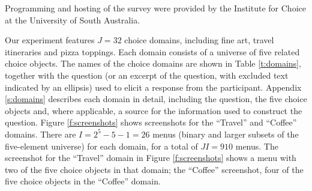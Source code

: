 \documentclass[11pt,letter]{article}
\newcommand{\menus}{menus}
\begin{document}
Programming and hosting of the survey were provided by the Institute for Choice at the University of South Australia.

Our experiment features $J=32$ choice domains, including fine art, travel itineraries and pizza toppings.
Each domain consists of a universe of five related choice objects.
The names of the choice domains are shown in Table \ref{t:domains}, together with the question (or an excerpt of the question, with excluded text indicated by an ellipsis) used to elicit a response from the participant.
Appendix \ref{s:domains} describes each domain in detail, including the question, the five choice objects and, where applicable, a source for the information used to construct the question.
Figure \ref{f:screenshots} shows screenshots for the ``Travel'' and ``Coffee'' domains.
There are $I=2^{5}-5-1=26$ \menus{} (binary and larger subsets of the five-element universe) for each domain, for a total of $JI=910$ \menus{}.
The screenshot for the ``Travel'' domain in Figure \ref{f:screenshots} shows a menu with two of the five choice objects in that domain; the ``Coffee'' screenshot, four of the five choice objects in the ``Coffee'' domain.
\end{document}
